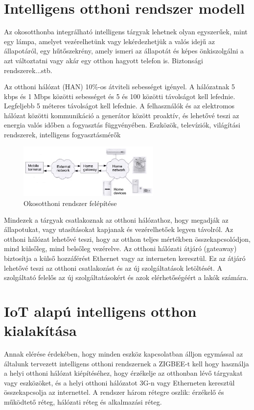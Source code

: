 \section{Intelligens otthoni rendszer modell}
Az okosotthonba integrálható intelligens tárgyak lehetnek olyan egyszerűek, mint egy lámpa, amelyet vezérelhetünk vagy lekérdezhetjük a valós idejű az állapotáról, egy hűtőszekrény, amely ismeri az állapotát és képes önkiszolgálni a azt változtatni vagy akár egy otthon hagyott telefon is. Biztonsági rendszerek...stb.
\par Az otthoni hálózat (HAN) 10\%-os átviteli sebességet igényel.
A hálózatnak 5 kbps és 1 Mbps közötti sebességet és 5 és 100 közötti távolságot kell lefednie.
Legfeljebb 5 méteres távolságot kell lefednie. A felhasználók és az elektromos hálózat közötti kommunikáció
a generátor között proaktív, és lehetővé teszi az energia
valós időben a fogyasztás függvényében. Eszközök,
televíziók, világítási rendszerek, intelligens fogyasztásmérők
\begin{figure}[!ht]
    \centering
    \includegraphics[width=70mm, keepaspectratio]{figures/Structure-of-smart-home-system.png}
    \caption{Okosotthoni rendszer felépítése}
\end{figure}
Mindezek a tárgyak csatlakoznak az otthoni hálózathoz, hogy megadják az állapotukat, vagy utasításokat kapjanak és vezérelhetőek legyen távolról. Az otthoni hálózat lehetővé teszi, hogy az otthon teljes mértékben összekapcsolódjon, mind külsőleg, mind belsőleg vezérelve. Az otthoni hálózati átjáró (gateaway) biztosítja a külső hozzáférést Ethernet vagy az interneten keresztül. Ez az átjáró lehetővé teszi az otthoni csatlakozást és az új szolgáltatások letöltését. A szolgáltató felelős az új szolgáltatásokért és azok elérhetőségéért a lakók számára.\cite{ricquebourg2006smart}

\section{IoT alapú intelligens otthon kialakítása}
Annak elérése érdekében, hogy minden eszköz kapcsolatban álljon egymással az általunk tervezett intelligens otthoni rendszernek a ZIGBEE-t kell hogy használja a helyi otthoni hálózat kiépítéséhez, hogy érzékelje az otthonban lévő tárgyakat vagy eszközöket, és a helyi otthoni hálózatot 3G-n vagy Etherneten keresztül összekapcsolja az internettel. A rendszer három rétegre oszlik: érzékelő és működtető réteg, hálózati réteg és alkalmazási réteg.


